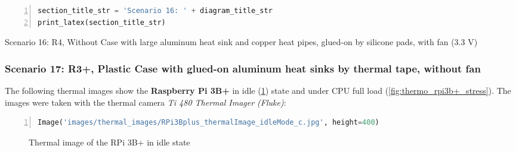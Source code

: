\documentclass[10pt,parskip=half,
toc=sectionentrywithdots,
bibliography=totocnumbered,
captions=tableheading,numbers=noendperiod]{scrartcl}
\begin{document}
\begin{figure}[H]\begin{center}\end{center}\end{figure}

\begin{lstlisting}[language=Python,numbers=left,xleftmargin=20pt,xrightmargin=5pt,belowskip=5pt,aboveskip=5pt]
section_title_str = 'Scenario 16: ' + diagram_title_str
print_latex(section_title_str)
\end{lstlisting}

\begin{table}[H]
\centering
\begin{adjustbox}{max width=\textwidth}
Scenario 16: R4, Without Case with large aluminum heat sink and copper heat pipes, glued-on by silicone pads, with fan (3.3 V)
\end{adjustbox}
\end{table}

\hypertarget{scenario-17-r3-plastic-case-with-glued-on-aluminum-heat-sinks-by-thermal-tape-without-fan}{%
\subsubsection{Scenario 17: R3+, Plastic Case with glued-on aluminum
heat sinks by thermal tape, without
fan}\label{scenario-17-r3-plastic-case-with-glued-on-aluminum-heat-sinks-by-thermal-tape-without-fan}}

The following thermal images show the \textbf{Raspberry Pi 3B+} in idle
(\cref{fig:thermo_rpi3b+_idle}) state and under CPU full load
(\cref{fig:thermo_rpi3b+_stress}). The images were taken with the
thermal camera \emph{Ti 480 Thermal Imager (Fluke)}:

\begin{lstlisting}[language=Python,numbers=left,xleftmargin=20pt,xrightmargin=5pt,belowskip=5pt,aboveskip=5pt]
Image('images/thermal_images/RPi3Bplus_thermalImage_idleMode_c.jpg', height=400)
\end{lstlisting}

    \begin{figure}[h!]\begin{center}\end{center}\caption{Thermal image of the RPi 3B+ in idle state}\label{fig:thermo_rpi3b+_idle}\end{figure}
\end{document}
